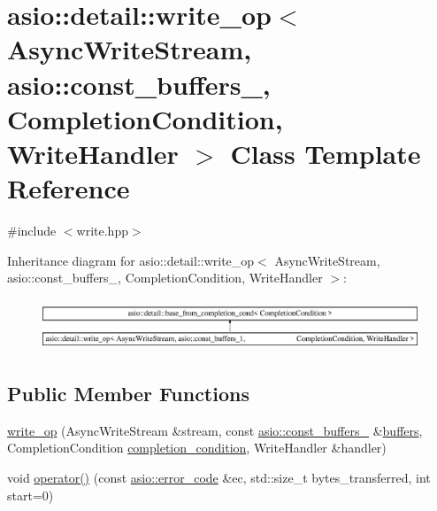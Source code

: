 \hypertarget{classasio_1_1detail_1_1write__op_3_01_async_write_stream_00_01asio_1_1const__buffers__1_00_01_014e1524567dd7f87180ace12b51858864}{}\section{asio\+:\+:detail\+:\+:write\+\_\+op$<$ Async\+Write\+Stream, asio\+:\+:const\+\_\+buffers\+\_, Completion\+Condition, Write\+Handler $>$ Class Template Reference}
\label{classasio_1_1detail_1_1write__op_3_01_async_write_stream_00_01asio_1_1const__buffers__1_00_01_014e1524567dd7f87180ace12b51858864}


{\ttfamily \#include $<$write.\+hpp$>$}

Inheritance diagram for asio\+:\+:detail\+:\+:write\+\_\+op$<$ Async\+Write\+Stream, asio\+:\+:const\+\_\+buffers\+\_, Completion\+Condition, Write\+Handler $>$\+:\begin{figure}[H]
\begin{center}
\leavevmode
\includegraphics[height=1.540578cm]{classasio_1_1detail_1_1write__op_3_01_async_write_stream_00_01asio_1_1const__buffers__1_00_01_014e1524567dd7f87180ace12b51858864}
\end{center}
\end{figure}
\subsection*{Public Member Functions}
\begin{DoxyCompactItemize}
\item 
\hyperlink{classasio_1_1detail_1_1write__op_3_01_async_write_stream_00_01asio_1_1const__buffers__1_00_01_014e1524567dd7f87180ace12b51858864_a35021104e8bd47e183197db2e3407b46}{write\+\_\+op} (Async\+Write\+Stream \&stream, const \hyperlink{classasio_1_1const__buffers__1}{asio\+::const\+\_\+buffers\+\_} \&\hyperlink{group__async__read_ga54dede45c3175148a77fe6635222c47d}{buffers}, Completion\+Condition \hyperlink{group__async__read_gae2e215d5013596cc2b385bb6c13fa518}{completion\+\_\+condition}, Write\+Handler \&handler)
\item 
void \hyperlink{classasio_1_1detail_1_1write__op_3_01_async_write_stream_00_01asio_1_1const__buffers__1_00_01_014e1524567dd7f87180ace12b51858864_a7c278fcc1f3bde4633cebfb6c3ca70ea}{operator()} (const \hyperlink{classasio_1_1error__code}{asio\+::error\+\_\+code} \&ec, std\+::size\+\_\+t bytes\+\_\+transferred, int start=0)
\end{DoxyCompactItemize}
